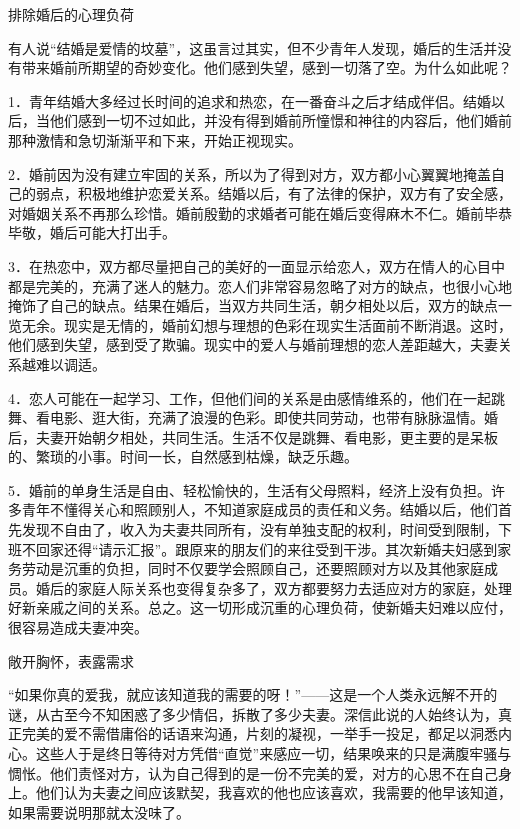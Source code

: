 \documentclass[12pt,UTF8]{ctexbook}
\begin{document}
排除婚后的心理负荷


有人说“结婚是爱情的坟墓”，这虽言过其实，但不少青年人发现，婚后的生活并没有带来婚前所期望的奇妙变化。他们感到失望，感到一切落了空。为什么如此呢？

1．青年结婚大多经过长时间的追求和热恋，在一番奋斗之后才结成伴侣。结婚以后，当他们感到一切不过如此，并没有得到婚前所憧憬和神往的内容后，他们婚前那种激情和急切渐渐平和下来，开始正视现实。

2．婚前因为没有建立牢固的关系，所以为了得到对方，双方都小心翼翼地掩盖自己的弱点，积极地维护恋爱关系。结婚以后，有了法律的保护，双方有了安全感，对婚姻关系不再那么珍惜。婚前殷勤的求婚者可能在婚后变得麻木不仁。婚前毕恭毕敬，婚后可能大打出手。

3．在热恋中，双方都尽量把自己的美好的一面显示给恋人，双方在情人的心目中都是完美的，充满了迷人的魅力。恋人们非常容易忽略了对方的缺点，也很小心地掩饰了自己的缺点。结果在婚后，当双方共同生活，朝夕相处以后，双方的缺点一览无余。现实是无情的，婚前幻想与理想的色彩在现实生活面前不断消退。这时，他们感到失望，感到受了欺骗。现实中的爱人与婚前理想的恋人差距越大，夫妻关系越难以调适。

4．恋人可能在一起学习、工作，但他们间的关系是由感情维系的，他们在一起跳舞、看电影、逛大街，充满了浪漫的色彩。即使共同劳动，也带有脉脉温情。婚后，夫妻开始朝夕相处，共同生活。生活不仅是跳舞、看电影，更主要的是呆板的、繁琐的小事。时间一长，自然感到枯燥，缺乏乐趣。

5．婚前的单身生活是自由、轻松愉快的，生活有父母照料，经济上没有负担。许多青年不懂得关心和照顾别人，不知道家庭成员的责任和义务。结婚以后，他们首先发现不自由了，收入为夫妻共同所有，没有单独支配的权利，时间受到限制，下班不回家还得“请示汇报”。跟原来的朋友们的来往受到干涉。其次新婚夫妇感到家务劳动是沉重的负担，同时不仅要学会照顾自己，还要照顾对方以及其他家庭成员。婚后的家庭人际关系也变得复杂多了，双方都要努力去适应对方的家庭，处理好新亲戚之间的关系。总之。这一切形成沉重的心理负荷，使新婚夫妇难以应付，很容易造成夫妻冲突。





敞开胸怀，表露需求


“如果你真的爱我，就应该知道我的需要的呀！”——这是一个人类永远解不开的谜，从古至今不知困惑了多少情侣，拆散了多少夫妻。深信此说的人始终认为，真正完美的爱不需借庸俗的话语来沟通，片刻的凝视，一举手一投足，都足以洞悉内心。这些人于是终日等待对方凭借“直觉”来感应一切，结果唤来的只是满腹牢骚与惆怅。他们责怪对方，认为自己得到的是一份不完美的爱，对方的心思不在自己身上。他们认为夫妻之间应该默契，我喜欢的他也应该喜欢，我需要的他早该知道，如果需要说明那就太没味了。
\end{document}
